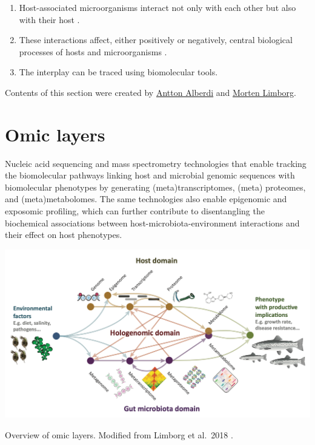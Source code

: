 \documentclass[
]{book}
\providecommand{\tightlist}{%
  \setlength{\itemsep}{0pt}\setlength{\parskip}{0pt}}
\begin{document}
\begin{enumerate}
\def\labelenumi{\arabic{enumi}.}
\tightlist
\item
  Host-associated microorganisms interact not only with each other but also with their host \citep{Fischer2017-wa}.
\item
  These interactions affect, either positively or negatively, central biological processes of hosts and microorganisms \citep{Wu2012-jt}.
\item
  The interplay can be traced using biomolecular tools.
\end{enumerate}

Contents of this section were created by \protect\hyperlink{antton-alberdi}{Antton Alberdi} and \protect\hyperlink{morten-limborg}{Morten Limborg}.

\hypertarget{omic-layers}{%
\section{Omic layers}\label{omic-layers}}

Nucleic acid sequencing and mass spectrometry technologies that enable tracking the biomolecular pathways linking host and microbial genomic sequences with biomolecular phenotypes by generating (meta)transcriptomes, (meta) proteomes, and (meta)metabolomes. The same technologies also enable epigenomic and exposomic profiling, which can further contribute to disentangling the biochemical associations between host-microbiota-environment interactions and their effect on host phenotypes.

\scriptsize

\includegraphics{images/omic_layers_limborg.png}
\normalsize

Overview of omic layers. Modified from Limborg et al.~2018 \citep{Limborg2018-tf}.
\end{document}
